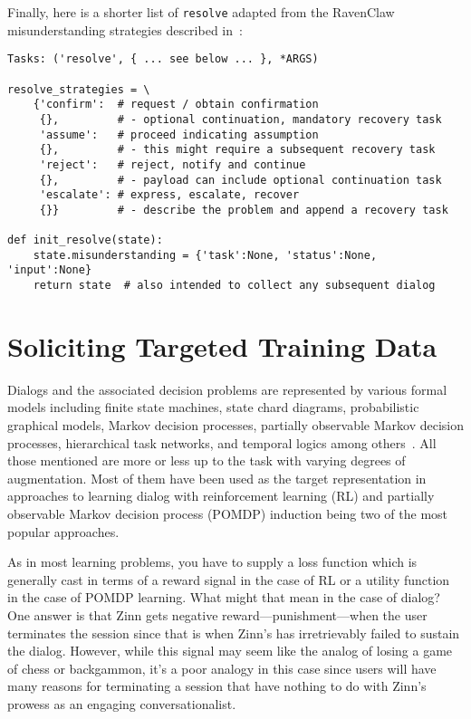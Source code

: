 \documentclass[letterpaper,11pt]{article}
\begin{document}
Finally, here is a shorter list of {\tt{resolve}} adapted from the RavenClaw misunderstanding strategies described in~\cite{BohusandRudnickyHLTEMNLP-05}:
%
\begin{verbatim}
Tasks: ('resolve', { ... see below ... }, *ARGS)

resolve_strategies = \
    {'confirm':  # request / obtain confirmation 
     {},         # - optional continuation, mandatory recovery task
     'assume':   # proceed indicating assumption 
     {},         # - this might require a subsequent recovery task
     'reject':   # reject, notify and continue 
     {},         # - payload can include optional continuation task
     'escalate': # express, escalate, recover
     {}}         # - describe the problem and append a recovery task

def init_resolve(state):
    state.misunderstanding = {'task':None, 'status':None, 'input':None} 
    return state  # also intended to collect any subsequent dialog
\end{verbatim}


\section*{Soliciting Targeted Training Data}

Dialogs and the associated decision problems are represented by various formal models including finite state machines, state chard diagrams, probabilistic graphical models, Markov decision processes, partially observable Markov decision processes, hierarchical task networks, and temporal logics among others~\cite{LitmanandAllenCS-87,SinghetalNIPS-99,SchatzmannetalKER-06,YoungetalIEEE-13}. All those mentioned are more or less up to the task with varying degrees of augmentation.  Most of them have been used as the target representation in approaches to learning dialog with reinforcement learning (RL) and partially observable Markov decision process (POMDP) induction being two of the most popular approaches.

As in most learning problems, you have to supply a loss function which is generally cast in terms of a reward signal in the case of RL or a utility function in the case of POMDP learning.  What might that mean in the case of dialog?  One answer is that Zinn gets negative reward---punishment---when the user terminates the session since that is when Zinn's has irretrievably failed to sustain the dialog. However, while this signal may seem like the analog of losing a game of chess or backgammon, it's a poor analogy in this case since users will have many reasons for terminating a session that have nothing to do with Zinn's prowess as an engaging conversationalist.  
\end{document}
